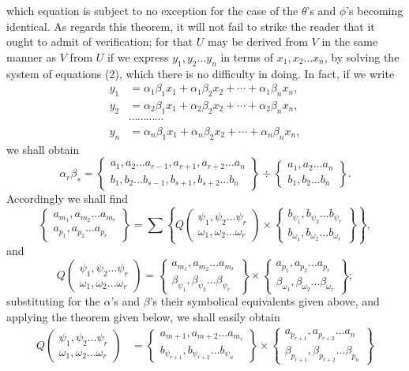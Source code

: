 \documentclass[11pt]{article}
\newcommand{\sourcepage}[1]{\marginpar{\scriptsize p.~#1}}
\newcommand{\bd}[2]{\left\{\begin{matrix}#1\\#2\end{matrix}\right\}}
\begin{document}
{{\sourcepage{248}
which equation is subject to no exception for the case of the $\theta$'s and $\phi$'s becoming identical. As regards this theorem, it will not fail to strike the reader that it ought to admit of verification; for that $U$ may be derived from $V$ in the same manner as $V$ from $U$ if we express $y_1,y_2\ldots y_n$ in terms of $x_1,x_2\ldots x_n$, by solving the system of equations (2), which there is no difficulty in doing. In fact, if we write
\[
\begin{aligned}
y_1&=\alpha_1\beta_1x_1+\alpha_1\beta_2x_2+\cdots+\alpha_1\beta_nx_n,\\
y_2&=\alpha_2\beta_1x_1+\alpha_2\beta_2x_2+\cdots+\alpha_2\beta_nx_n,\\
&\cdots\cdots\cdots\cdots\\
y_n&=\alpha_n\beta_1x_1+\alpha_n\beta_2x_2+\cdots+\alpha_n\beta_nx_n,
\end{aligned}
\]
we shall obtain
\[
\alpha_r\beta_s=
\bd{a_1,a_2\ldots a_{r-1},a_{r+1},a_{r+2}\ldots a_n}{b_1,b_2\ldots b_{s-1},b_{s+1},b_{s+2}\ldots b_n}
\div
\bd{a_1,a_2\ldots a_n}{b_1,b_2\ldots b_n}.
\]
Accordingly we shall find
\[
\bd{a_{m_1},a_{m_2}\ldots a_{m_r}}{a_{p_1},a_{p_2}\ldots a_{p_r}}
=
\sum\left\{Q\left(\begin{matrix}\psi_1,\psi_2\ldots\psi_r\\ \omega_1,\omega_2\ldots\omega_r\end{matrix}\right)
\times
\bd{b_{\psi_1},b_{\psi_2}\ldots b_{\psi_r}}{b_{\omega_1},b_{\omega_2}\ldots b_{\omega_r}}
\right\},
\]
and
\[
Q\left(\begin{matrix}\psi_1,\psi_2\ldots\psi_r\\ \omega_1,\omega_2\ldots\omega_r\end{matrix}\right)
=\bd{a_{m_1},a_{m_2}\ldots a_{m_r}}{\beta_{\psi_1},\beta_{\psi_2}\ldots\beta_{\psi_r}}
\times
\bd{a_{p_1},a_{p_2}\ldots a_{p_r}}{\beta_{\omega_1},\beta_{\omega_2}\ldots\beta_{\omega_r}};
\]
substituting for the $\alpha$'s and $\beta$'s their symbolical equivalents given above, and applying the theorem given below, we shall easily obtain
\[
\begin{aligned}
Q\left(\begin{matrix}\psi_1,\psi_2\ldots\psi_r\\ \omega_1,\omega_2\ldots\omega_r\end{matrix}\right)
&=
\bd{a_{m+1},a_{m+2}\ldots a_{m_r}}{b_{\psi_{r+1}},b_{\psi_{r+2}}\ldots b_{\psi_n}}
\times
\bd{a_{p_{r+1}},a_{p_{r+2}}\ldots a_n}{\beta_{p_{r+1}},\beta_{p_{r+2}}\ldots \beta_{p_n}}\\

\end{aligned}\]}}
\end{document}
